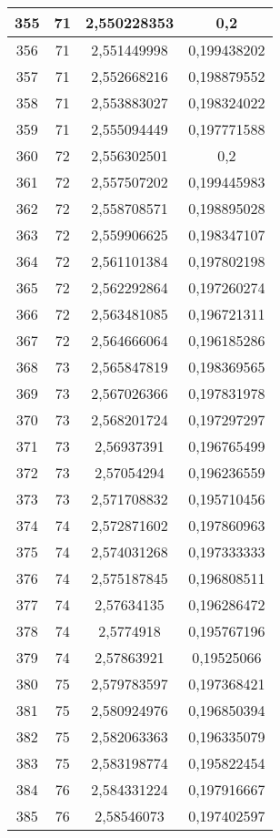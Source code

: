 {\begin{minipage}[!h]{0.45\textwidth}
\begin{longtable}{cccc}
355 & 71 & 2,550228353 & 0,2 \\ \hline
356 & 71 & 2,551449998 & 0,199438202 \\ \hline
357 & 71 & 2,552668216 & 0,198879552 \\ \hline
358 & 71 & 2,553883027 & 0,198324022 \\ \hline
359 & 71 & 2,555094449 & 0,197771588 \\ \hline
360 & 72 & 2,556302501 & 0,2 \\ \hline
361 & 72 & 2,557507202 & 0,199445983 \\ \hline
362 & 72 & 2,558708571 & 0,198895028 \\ \hline
363 & 72 & 2,559906625 & 0,198347107 \\ \hline
364 & 72 & 2,561101384 & 0,197802198 \\ \hline
365 & 72 & 2,562292864 & 0,197260274 \\ \hline
366 & 72 & 2,563481085 & 0,196721311 \\ \hline
367 & 72 & 2,564666064 & 0,196185286 \\ \hline
368 & 73 & 2,565847819 & 0,198369565 \\ \hline
369 & 73 & 2,567026366 & 0,197831978 \\ \hline
370 & 73 & 2,568201724 & 0,197297297 \\ \hline
371 & 73 & 2,56937391 & 0,196765499 \\ \hline
372 & 73 & 2,57054294 & 0,196236559 \\ \hline
373 & 73 & 2,571708832 & 0,195710456 \\ \hline
374 & 74 & 2,572871602 & 0,197860963 \\ \hline
375 & 74 & 2,574031268 & 0,197333333 \\ \hline
376 & 74 & 2,575187845 & 0,196808511 \\ \hline
377 & 74 & 2,57634135 & 0,196286472 \\ \hline
378 & 74 & 2,5774918 & 0,195767196 \\ \hline
379 & 74 & 2,57863921 & 0,19525066 \\ \hline
380 & 75 & 2,579783597 & 0,197368421 \\ \hline
381 & 75 & 2,580924976 & 0,196850394 \\ \hline
382 & 75 & 2,582063363 & 0,196335079 \\ \hline
383 & 75 & 2,583198774 & 0,195822454 \\ \hline
384 & 76 & 2,584331224 & 0,197916667 \\ \hline
385 & 76 & 2,58546073 & 0,197402597 \\ \hline

\end{longtable}
\end{minipage}}
